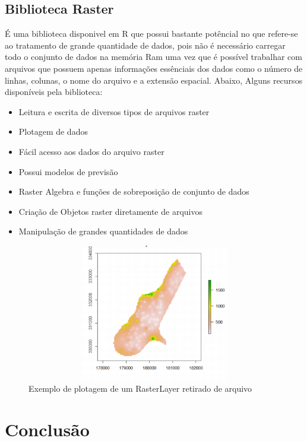 \documentclass[12pt,letterpaper]{article}
\begin{document}
\subsection{Biblioteca Raster}

É uma biblioteca disponivel em R que possui bastante potêncial no que refere-se ao tratamento de grande quantidade de dados, pois não é necessário carregar todo o conjunto de dados na memória Ram uma vez que é possível trabalhar com arquivos que possuem apenas informações essênciais dos dados como o número de linhas, colunas, o nome do arquivo e a extensão espacial. Abaixo, Alguns recursos disponíveis pela biblioteca:

\begin{itemize}

\item Leitura e escrita de diversos tipos de arquivos raster
\item Plotagem de dados
\item Fácil acesso aos dados do arquivo raster
\item Possui modelos de previsão
\item Raster Algebra e funções de sobreposição de conjunto de dados
\item Criação de Objetos raster diretamente de arquivos
\item Manipulação de grandes quantidades de dados

\end{itemize}

\begin{figure}

\centering
   \includegraphics[width=12cm,height=6cm]{RasterLayer.png}
	\caption{Exemplo de plotagem de um RasterLayer retirado de arquivo}
    
\end{figure}

\section{Conclusão}
\end{document}
